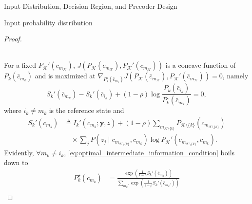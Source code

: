 \documentclass[journal]{IEEEtran}
\begin{document}
\begin{section}{Input Distribution, Decision Region, and Precoder Design}
\begin{subsection}{Input probability distribution}
\begin{proof}
\begin{figure*}[!b]
\begin{align}
						\label{eq:intermediate_information_function}
					\end{align}
				\end{figure*}
				For a fixed $P_{\mathcal{K}}'(\bar{c}_{m_{\mathcal{K}}})$, $J \left( P_{\mathcal{K}}(\bar{c}_{m_{\mathcal{K}}}),P_{\mathcal{K}}'(\bar{c}_{m_{\mathcal{K}}}) \right)$ is a concave function of $P_k(\bar{c}_{m_k})$ and is maximized at $\nabla_{P_k^\star(\bar{c}_{m_k})} J \left( P_{\mathcal{K}}(\bar{c}_{m_{\mathcal{K}}}),P_{\mathcal{K}}'(\bar{c}_{m_{\mathcal{K}}}) \right) = 0$, namely
				\begin{equation}
					S_k'(\bar{c}_{m_k}) - S_k'(\bar{c}_{i_k}) + (1 - \rho) \log \frac{P_k(\bar{c}_{i_k})}{P_k^\star(\bar{c}_{m_k})} = 0,
					\label{eq:optimal_intermediate_information_condition}
				\end{equation}
				where $i_k \ne m_k$ is the reference state and
				\begin{align}
					S_k'(\bar{c}_{m_k})
					& \triangleq I_k'(\bar{c}_{m_k};\boldsymbol{y},z) + (1 - \rho) \sum_{m_{\mathcal{K} \setminus \{k\}}} P_{\mathcal{K} \setminus \{k\}}(\bar{c}_{m_{\mathcal{K} \setminus \{k\}}})\nonumber\\
					& \quad \times \sum_j P(\bar{z}_j \mid \bar{c}_{m_{\mathcal{K} \setminus \{k\}}},\bar{c}_{m_k}) \log P_{\mathcal{K}}'(\bar{c}_{m_{\mathcal{K} \setminus \{k\}}},\bar{c}_{m_k}).
				\end{align}
				Evidently, $\forall m_k \ne i_k$, \eqref{eq:optimal_intermediate_information_condition} boils down to
				\begin{subequations}
					\begin{align}
						P_k^\star(\bar{c}_{m_k})
						& = \frac{\exp \left( \frac{1}{1 - \rho} S_k'(\bar{c}_{m_k}) \right)}{\sum_{m_k'} \exp \left( \frac{1}{1 - \rho} S_k'(\bar{c}_{m_k'}) \right)}\\

\end{align}
\end{subequations}
\end{proof}
\end{subsection}
\end{section}
\end{document}
